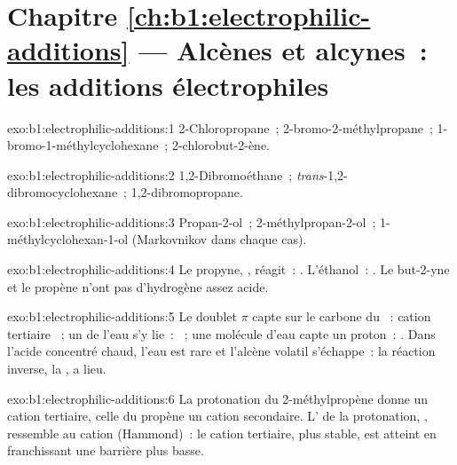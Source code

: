 \section*{Chapitre \ref{ch:b1:electrophilic-additions} --- Alcènes et alcynes~: les additions électrophiles}

\begin{solution}{exo:b1:electrophilic-additions:1}
2-Chloropropane~; 2-bromo-2-méthylpropane~; 1-bromo-1-méthylcyclohexane~;
2-chlorobut-2-ène.
\end{solution}

\begin{solution}{exo:b1:electrophilic-additions:2}
1,2-Dibromoéthane~; \textit{trans}-1,2-dibromocyclohexane~;
1,2-dibromopropane.
\end{solution}

\begin{solution}{exo:b1:electrophilic-additions:3}
Propan-2-ol~; 2-méthylpropan-2-ol~; 1-méthylcyclohexan-1-ol (Markovnikov
dans chaque cas).
\end{solution}

\begin{solution}{exo:b1:electrophilic-additions:4}
Le propyne, , réagit~: .
L'éthanol~:
. Le but-2-yne et le propène n'ont
pas d'hydrogène assez acide.
\end{solution}

\begin{solution}{exo:b1:electrophilic-additions:5}
Le doublet $\pi$ capte  sur le carbone du ~: cation
tertiaire ~; un  de l'eau s'y lie~:
~; une molécule d'eau capte un proton~: .
Dans l'acide concentré chaud, l'eau est rare et l'alcène volatil
s'échappe~: la réaction inverse, la , a lieu.
\end{solution}

\begin{solution}{exo:b1:electrophilic-additions:6}
La protonation du 2-méthylpropène donne un cation tertiaire, celle du
propène un cation secondaire. L' de la protonation,
, ressemble au cation (Hammond)~: le
cation tertiaire, plus stable, est atteint en franchissant une barrière
plus basse.
\end{solution}

